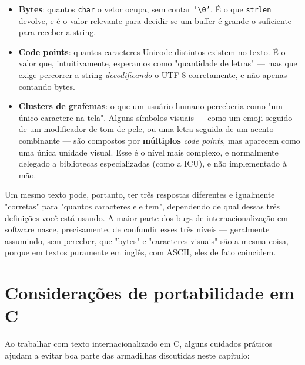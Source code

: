 \documentclass[12pt,a4paper,oneside]{extreport}
\begin{document}
\begin{itemize}
    \item \textbf{Bytes}: quantos \texttt{char} o vetor ocupa, sem contar \texttt{'\textbackslash 0'}. É o que \texttt{strlen} devolve, e é o valor relevante para decidir se um buffer é grande o suficiente para receber a string.
    \item \textbf{Code points}: quantos caracteres Unicode distintos existem no texto. É o valor que, intuitivamente, esperamos como "quantidade de letras" — mas que exige percorrer a string \textit{decodificando} o UTF-8 corretamente, e não apenas contando bytes.
    \item \textbf{Clusters de grafemas}: o que um usuário humano perceberia como "um único caractere na tela". Alguns símbolos visuais — como um emoji seguido de um modificador de tom de pele, ou uma letra seguida de um acento combinante — são compostos por \textbf{múltiplos} \textit{code points}, mas aparecem como uma única unidade visual. Esse é o nível mais complexo, e normalmente delegado a bibliotecas especializadas (como a ICU), e não implementado à mão.
\end{itemize}

Um mesmo texto pode, portanto, ter três respostas diferentes e igualmente "corretas" para "quantos caracteres ele tem", dependendo de qual dessas três definições você está usando. A maior parte dos bugs de internacionalização em software nasce, precisamente, de confundir esses três níveis — geralmente assumindo, sem perceber, que "bytes" e "caracteres visuais" são a mesma coisa, porque em textos puramente em inglês, com ASCII, eles de fato coincidem.

\section*{Considerações de portabilidade em C}

Ao trabalhar com texto internacionalizado em C, alguns cuidados práticos ajudam a evitar boa parte das armadilhas discutidas neste capítulo:
\end{document}
